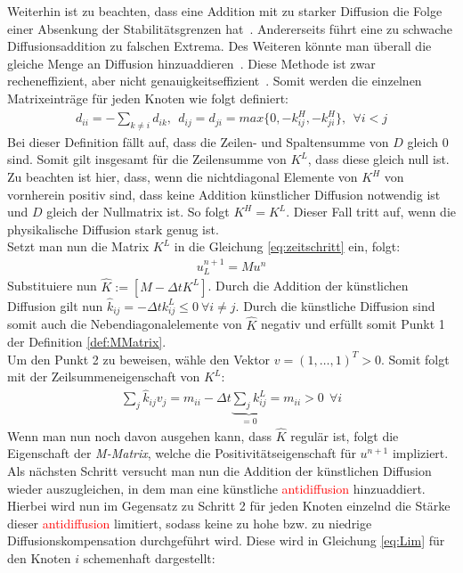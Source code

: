 \documentclass[a4paper,11pt]{article}
\newcommand{\col}[2][red]{\textcolor{#1}{#2}}
\begin{document}
Weiterhin ist zu beachten, dass eine Addition mit zu starker Diffusion die Folge einer Absenkung der Stabilitätsgrenzen hat~\cite{kuzmin2002flux}. Andererseits führt eine zu schwache Diffusionsaddition zu falschen Extrema. Des Weiteren könnte man überall die gleiche Menge an Diffusion hinzuaddieren~\cite{kuzmin2002flux}. Diese Methode ist zwar recheneffizient, aber nicht genauigkeitseffizient~\cite{kuzmin2002flux}. Somit werden die einzelnen Matrixeinträge für jeden Knoten wie folgt definiert:
\begin{align}
 d_{ii}=-\sum_{k\neq i}d_{ik},~~d_{ij}=d_{ji}=max\{0,-k_{ij}^H,-k_{ji}^H\},~~\forall i<j
\end{align}
Bei dieser Definition fällt auf, dass die Zeilen- und Spaltensumme von $D$ gleich 0 sind. Somit gilt insgesamt für die Zeilensumme von $K^L$, dass diese gleich null ist. Zu beachten ist hier, dass, wenn die nichtdiagonal Elemente von $K^H$ von vornherein positiv sind, dass keine Addition künstlicher Diffusion notwendig ist und $D$ gleich der Nullmatrix ist. So folgt $K^H=K^L$. Dieser Fall tritt auf, wenn die physikalische Diffusion stark genug ist.\\
Setzt man nun die Matrix $K^L$ in die Gleichung \eqref{eq:zeitschritt} ein, folgt:
\begin{align}
 [M-\Delta tK^L]u_L^{n+1}=Mu^n
\end{align}
Substituiere nun $\widehat{K}:=[M-\Delta tK^L]$. Durch die Addition der künstlichen Diffusion gilt nun $\widehat{k}_{ij}=-\Delta tk_{ij}^L\le0~\forall i\neq j$. Durch die künstliche Diffusion sind somit auch die Nebendiagonalelemente von $\widehat{K}$ negativ und erfüllt somit Punkt 1 der Definition \ref{def:MMatrix}.\\
Um den Punkt 2 zu beweisen, wähle den Vektor $v=(1,\dots,1)^T>0$. Somit folgt mit der Zeilsummeneigenschaft von $K^L$:
\begin{align}
 \sum_j \widehat{k}_{ij} v_j=m_{ii} - \Delta t\underbrace{\sum_j k_{ij}^L}_{=0}=m_{ii}>0~~\forall i
\end{align}
Wenn man nun noch davon ausgehen kann, dass $\widehat{K}$ regulär ist, folgt die Eigenschaft der \textit{M-Matrix}, welche die Positivitätseigenschaft für $u^{n+1}$ impliziert.\\
Als nächsten Schritt versucht man nun die Addition der künstlichen Diffusion wieder auszugleichen, in dem man eine künstliche \col{antidiffusion} hinzuaddiert. Hierbei wird nun im Gegensatz zu Schritt 2 für jeden Knoten einzelnd die Stärke dieser \col{antidiffusion}  limitiert, sodass keine zu hohe bzw. zu niedrige Diffusionskompensation durchgeführt wird. Diese wird in Gleichung \eqref{eq:Lim} für den Knoten $i$ schemenhaft dargestellt:
\end{document}
